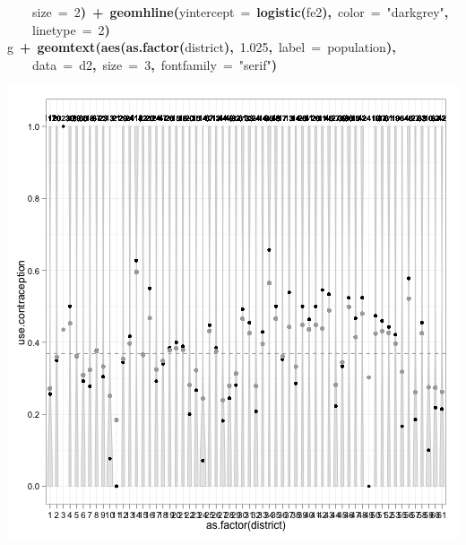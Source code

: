\documentclass{article}
\makeatletter
\newcommand{\hlnumber}[1]{\textcolor[rgb]{0,0,0}{#1}}%
\newcommand{\hlfunctioncall}[1]{\textcolor[rgb]{.5,0,.33}{\textbf{#1}}}%
\newcommand{\hlstring}[1]{\textcolor[rgb]{.6,.6,1}{#1}}%
\newcommand{\hlkeyword}[1]{\textbf{#1}}%
\newcommand{\hlargument}[1]{\textcolor[rgb]{.69,.25,.02}{#1}}%
\newcommand{\hlsymbol}[1]{#1}%
\newcommand{\hlstd}[1]{\textcolor[rgb]{0,0,0}{#1}}%
\newenvironment{kframe}{%
 \def\FrameCommand##1{\hskip\@totalleftmargin \hskip-\fboxsep
 \colorbox{shadecolor}{##1}\hskip-\fboxsep
     \hskip-\linewidth \hskip-\@totalleftmargin \hskip\columnwidth}%
 \MakeFramed {\advance\hsize-\width
   \@totalleftmargin\z@ \linewidth\hsize
   \@setminipage}}%
 {\par\unskip\endMakeFramed}
\newenvironment{knitrout}{}{} %
\makeatother
\begin{document}
\begin{knitrout}
{\begin{kframe}
\begin{flushleft}
\hlstd{}{\ }{\ }{\ }{\ }\hlargument{size}{\ }\hlargument{=}{\ }\hlnumber{2}\hlkeyword{)}{\ }\hlkeyword{+}{\ }\hlfunctioncall{geom\usebox{\hlnormalsizeboxunderscore}hline}\hlkeyword{(}\hlargument{yintercept}{\ }\hlargument{=}{\ }\hlfunctioncall{logistic}\hlkeyword{(}\hlsymbol{fe2}\hlkeyword{)}\hlkeyword{,}{\ }\hlargument{color}{\ }\hlargument{=}{\ }\hlstring{"darkgrey"}\hlkeyword{,}\hspace*{\fill}\\
\hlstd{}{\ }{\ }{\ }{\ }\hlargument{linetype}{\ }\hlargument{=}{\ }\hlnumber{2}\hlkeyword{)}\hspace*{\fill}\\
\hlstd{}\hlsymbol{g}{\ }\hlkeyword{+}{\ }\hlfunctioncall{geom\usebox{\hlnormalsizeboxunderscore}text}\hlkeyword{(}\hlfunctioncall{aes}\hlkeyword{(}\hlfunctioncall{as.factor}\hlkeyword{(}\hlsymbol{district}\hlkeyword{)}\hlkeyword{,}{\ }\hlnumber{1.025}\hlkeyword{,}{\ }\hlargument{label}{\ }\hlargument{=}{\ }\hlsymbol{population}\hlkeyword{)}\hlkeyword{,}\hspace*{\fill}\\
\hlstd{}{\ }{\ }{\ }{\ }\hlargument{data}{\ }\hlargument{=}{\ }\hlsymbol{d2}\hlkeyword{,}{\ }\hlargument{size}{\ }\hlargument{=}{\ }\hlnumber{3}\hlkeyword{,}{\ }\hlargument{fontfamily}{\ }\hlargument{=}{\ }\hlstring{"serif"}\hlkeyword{)}\mbox{}
\normalfont
\end{flushleft}
\includegraphics{compare-plot} \end{kframe}}
\end{knitrout}
\end{document}
